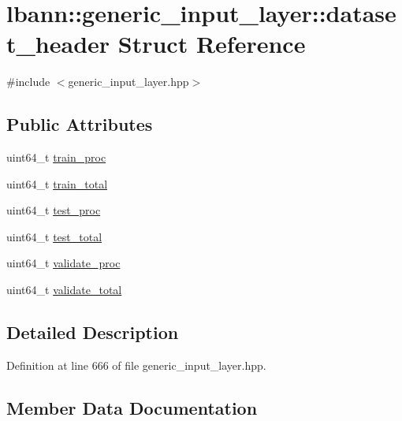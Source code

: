\hypertarget{structlbann_1_1generic__input__layer_1_1dataset__header}{}\section{lbann\+:\+:generic\+\_\+input\+\_\+layer\+:\+:dataset\+\_\+header Struct Reference}
\label{structlbann_1_1generic__input__layer_1_1dataset__header}


{\ttfamily \#include $<$generic\+\_\+input\+\_\+layer.\+hpp$>$}

\subsection*{Public Attributes}
\begin{DoxyCompactItemize}
\item 
uint64\+\_\+t \hyperlink{structlbann_1_1generic__input__layer_1_1dataset__header_a6866a03f6906e925426ca228e36b416f}{train\+\_\+proc}
\item 
uint64\+\_\+t \hyperlink{structlbann_1_1generic__input__layer_1_1dataset__header_a2b748bb9a5d76753032dfc707ab1c1fb}{train\+\_\+total}
\item 
uint64\+\_\+t \hyperlink{structlbann_1_1generic__input__layer_1_1dataset__header_a8da8b64d9d85fc957d5a0473a8256664}{test\+\_\+proc}
\item 
uint64\+\_\+t \hyperlink{structlbann_1_1generic__input__layer_1_1dataset__header_a41af5bce08ef28d6d7b0ad5bb8b6a451}{test\+\_\+total}
\item 
uint64\+\_\+t \hyperlink{structlbann_1_1generic__input__layer_1_1dataset__header_a6eb5b167b79fcbad04e7365fb8b0e570}{validate\+\_\+proc}
\item 
uint64\+\_\+t \hyperlink{structlbann_1_1generic__input__layer_1_1dataset__header_ae44f4d697cd62da2e5daa620ebf0e40c}{validate\+\_\+total}
\end{DoxyCompactItemize}


\subsection{Detailed Description}


Definition at line 666 of file generic\+\_\+input\+\_\+layer.\+hpp.



\subsection{Member Data Documentation}
\mbox{\label{structlbann_1_1generic__input__layer_1_1dataset__header_a8da8b64d9d85fc957d5a0473a8256664}} 
